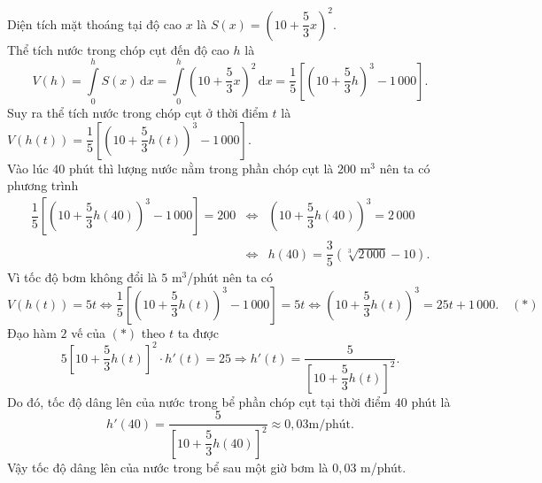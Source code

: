 \begin{ex}
{Diện tích mặt thoáng tại độ cao $x$ là $S(x)=\left(10+\dfrac{5}{3}x\right)^2$.\\
Thể tích nước trong chóp cụt đến độ cao $h$ là \[V(h)=\displaystyle\int\limits_0^hS(x)\,\mathrm{d}x=\int\limits_0^h\left(10+\dfrac{5}{3}x\right)^2\,\mathrm{d}x=\dfrac{1}{5}\left[\left(10+\dfrac{5}{3}h\right)^3-1\,000\right].\]
Suy ra thể tích nước trong chóp cụt ở thời điểm $t$ là $V(h(t))=\dfrac{1}{5}\left[\left(10+\dfrac{5}{3}h(t)\right)^3-1\,000\right]$.\\
Vào lúc $40$ phút thì lượng nước nằm trong phần chóp cụt là $200$ m$^3$ nên ta có phương trình \begin{eqnarray*}
\dfrac{1}{5}\left[\left(10+\dfrac{5}{3}h(40)\right)^3-1\,000\right]=200&\Leftrightarrow &\left(10+\dfrac{5}{3}h(40)\right)^3=2\,000\\
&\Leftrightarrow& h(40)=\dfrac{3}{5}\left(\sqrt[3]{2\,000}-10\right).
\end{eqnarray*}
Vì tốc độ bơm không đổi là $5$ m$^3$/phút nên ta có \[V(h(t))=5t\Leftrightarrow \dfrac{1}{5}\left[\left(10+\dfrac{5}{3}h(t)\right)^3-1\,000\right]=5t\Leftrightarrow \left(10+\dfrac{5}{3}h(t)\right)^3=25t+1\,000.\quad (*)\]
Đạo hàm $2$ vế của $(*)$ theo $t$ ta được
\[5\left[10+\dfrac{5}{3}h(t)\right]^2\cdot h'(t)=25\Rightarrow h'(t)=\dfrac{5}{\left[10+\dfrac{5}{3}h(t)\right]^2}.\]
Do đó, tốc độ dâng lên của nước trong bể phần chóp cụt tại thời điểm $40$ phút là \[h'(40)=\dfrac{5}{\left[10+\dfrac{5}{3}h(40)\right]^2}\approx 0{,}03 \text{m/phút}.\]
Vậy tốc độ dâng lên của nước trong bể sau một giờ bơm là $0{,}03$ m/phút.
}
\end{ex}

